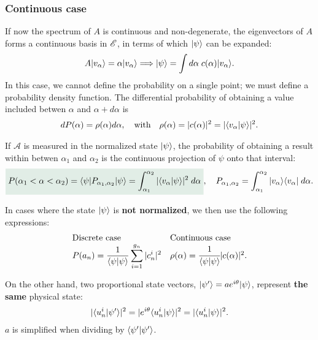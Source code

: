 \subsubsection{Continuous case}
If now the spectrum of $A$ is continuous and non-degenerate, the eigenvectors of $A$ forms a continuous basis in $\mathscr{E}$, in terms of which $|\psi\rangle$ can be expanded: 
\begin{align*}
    A|v_\alpha\rangle=\alpha|v_\alpha\rangle\Longrightarrow|\psi\rangle=\int d\alpha\;c(\alpha)|v_\alpha\rangle.
\end{align*}
In this case, we cannot define the probability on a single point; we must define a probability density function. The differential probability of obtaining a value 
included betwen $\alpha$ and $\alpha+d\alpha$ is 
\begin{align*}
    dP(\alpha)=\rho(\alpha)d\alpha,\quad\text{with}\quad \rho(\alpha)=|c(\alpha)|^2=|\langle v_\alpha|\psi\rangle|^2.
\end{align*}

\begin{definition}
    If $\mathcal{A}$ is measured in the normalized state $|\psi\rangle$, the probability of obtaining a result within betwen $\alpha_1$ and $\alpha_2$ is 
    the continuous projection of $\psi$ onto that interval:
    \begin{align}
        \highlight{P(\alpha_1<\alpha<\alpha_2)=\braket{\psi|P_{\alpha_1,\alpha_2}|\psi}=\int_{\alpha_1}^{\alpha_2}|\braket{v_\alpha|\psi}|^2\;d\alpha},\quad P_{\alpha_1,\alpha_2}=\int_{\alpha_1}^{\alpha_2}\ket{v_\alpha}\bra{v_\alpha}\;d\alpha.
    \end{align}
\end{definition}
In cases where the state $|\psi\rangle$ is \textbf{not normalized}, we then use the following expressions:
\begin{align}
    \begin{array}{ll}
    \text{Discrete case}&\text{Continuous case}\\
    P(a_n)=\displaystyle\frac{1}{\langle\psi|\psi\rangle}\sum_{i=1}^{g_n}|c^i_n|^2&\rho(\alpha)=\cfrac{1}{\langle\psi|\psi\rangle}|c(\alpha)|^2.        
    \end{array}
    \label{eq:probabilityfunction}
\end{align}

On the other hand, two proportional state vectors, $|\psi'\rangle=ae^{i\theta}|\psi\rangle$, represent \textbf{the same} physical state:
\begin{align*}
    |\langle u_n^i|\psi'\rangle|^2=|e^{i\theta}\langle u_n^i|\psi\rangle|^2=|\langle u_n^i|\psi\rangle|^2.
\end{align*}
$a$ is simplified when dividing by $\langle\psi'|\psi'\rangle$.


